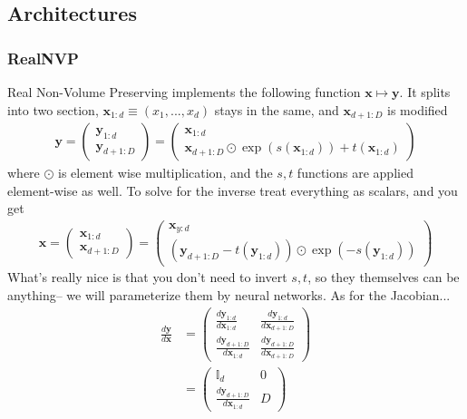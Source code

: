 \subsection{Architectures}
\subsubsection{RealNVP}
Real Non-Volume Preserving implements the following function $\mathbf x \mapsto \mathbf y$. It splits into two section, $\mathbf x_{1:d} \equiv (x_1, ..., x_d)$ stays in the same, and $\mathbf x_{d+1: D}$ is modified
\begin{align}
	\mathbf y = \begin{pmatrix}
		\mathbf y_{1:d}\\ \mathbf y_{d+1: D}
	\end{pmatrix}  = \begin{pmatrix}
		\mathbf x_{1:d}\\ \mathbf x_{d+1:D} \odot  \exp(s(\mathbf x_{1 :d})) + t(\mathbf x_{1:d})
	\end{pmatrix}
\end{align}
where $\odot$ is element wise multiplication, and the $s, t$ functions are applied element-wise as well. To solve for the inverse treat everything as scalars, and you get
\begin{align}
	\mathbf x = \begin{pmatrix}
		\mathbf x_{1:d} \\ \mathbf x_{d+1:D}
	\end{pmatrix} = \begin{pmatrix}
		\mathbf x_{y:d} \\ (\mathbf y_{d+1:D} - t(\mathbf y_{1:d})) \odot \exp(- s(\mathbf y_{1:d}))
	\end{pmatrix}
\end{align}
What's really nice is that you don't need to invert $s,t$, so they themselves can be anything-- we will parameterize them by neural networks. As for the Jacobian...
\begin{align}
	\frac{d\mathbf y}{d \mathbf x} & = 
	\begin{pmatrix}
		\frac{d\mathbf y_{1:d}}{d \mathbf x_{1:d}} & \frac{d \mathbf y_{1:d}}{d \mathbf x_{d+1:D}}\\
		\frac{d\mathbf y_{d+1:D}}{d \mathbf x_{1:d}} & \frac{d\mathbf y_{d+1:D}}{d \mathbf x_{d+1:D}}
	\end{pmatrix}\\
	& = \begin{pmatrix}
		\mathbb I_d  & 0 \\
		\frac{d\mathbf y_{d+1:D}}{d \mathbf x_{1:d}}  & D 
	\end{pmatrix}
\end{align}
